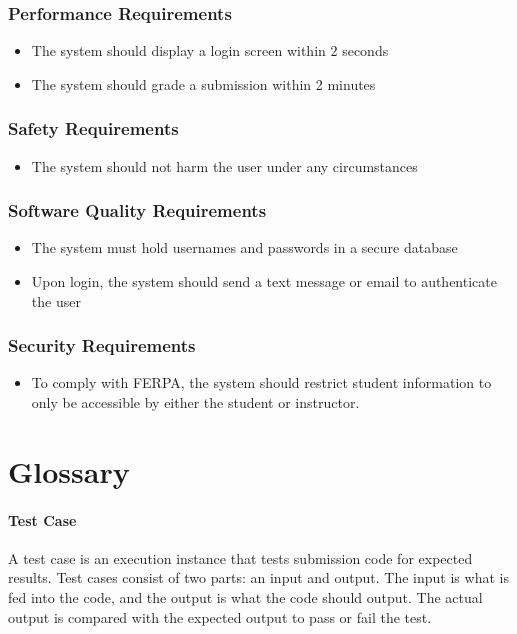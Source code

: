 \documentclass{article}
\begin{document}
\subsubsection{Performance Requirements}
\begin{itemize}
  \item The system should display a login screen within 2 seconds
  \item The system should grade a submission within 2 minutes
\end{itemize}

\subsubsection{Safety Requirements}
\begin{itemize}
  \item The system should not harm the user under any circumstances
\end{itemize}

\subsubsection{Software Quality Requirements}
\begin{itemize}
  \item The system must hold usernames and passwords in a secure database
  \item Upon login, the system should send a text message or email to authenticate the user
\end{itemize}

\subsubsection{Security Requirements}

\begin{itemize}
  \item To comply with FERPA, the system should restrict student information to only be accessible by either the student or instructor.
\end{itemize}

\newpage
\appendix

\section{Glossary}

\paragraph{Test Case} A test case is an execution instance that tests submission code for expected results. Test cases consist of two parts: an input and output. The input is what is fed into the code, and the output is what the code should output. The actual output is compared with the expected output to pass or fail the test.
\end{document}
